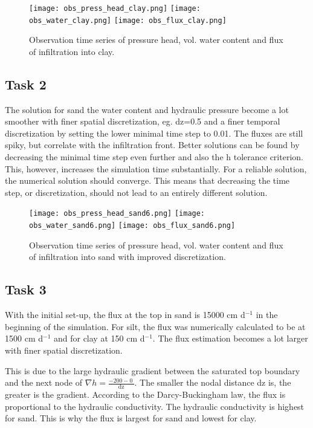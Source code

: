 \documentclass[
10pt, %
a4paper, %
oneside, %
headinclude,footinclude, %
BCOR5mm, %
]{scrartcl}
\begin{document}
\begin{figure}[!h]
\centering
\texttt{[image: obs\_press\_head\_clay.png]}
\texttt{[image: obs\_water\_clay.png]}
\texttt{[image: obs\_flux\_clay.png]}
\caption{Observation time series of pressure head, vol. water content and flux of infiltration into clay.}

\end{figure}

\newpage
\newpage
\subsection*{Task 2}

The solution for sand the water content and hydraulic pressure become a lot smoother with finer spatial discretization, eg. dz=0.5 and a finer temporal discretization by setting the lower minimal time step to 0.01. The fluxes are still spiky, but correlate with the infiltration front. Better solutions can be found by decreasing the minimal time step even further and also the h tolerance criterion. This, however, increases the simulation time substantially. For a reliable solution, the numerical solution should converge. This means that decreasing the time step, or discretization, should not lead to an entirely different solution. 
\begin{figure}[!h]
	\centering
	\texttt{[image: obs\_press\_head\_sand6.png]}
	\texttt{[image: obs\_water\_sand6.png]}
	\texttt{[image: obs\_flux\_sand6.png]}
	\caption{Observation time series of pressure head, vol. water content and flux of infiltration into sand with improved discretization.}
\end{figure}

\subsection*{Task 3}
With the initial set-up, the flux at the top in sand is 15000 cm d$^{-1}$ in the beginning of the simulation. For silt, the flux was numerically calculated to be at 1500 cm d$^{-1}$ and for clay at 150 cm d$^{-1}$. The flux estimation becomes a lot larger with finer spatial discretization.

 This is due to the large hydraulic gradient between the saturated top boundary and the next node of $\nabla h=\frac{-200-0~}{\mathrm{dz}}$. The smaller the nodal distance dz is, the greater is the gradient. According to the Darcy-Buckingham law, the flux is proportional to the hydraulic conductivity. The hydraulic conductivity is highest for sand. This is why the flux is largest for sand and lowest for clay.
\newpage
\newpage
\newpage
\newpage
\end{document}
